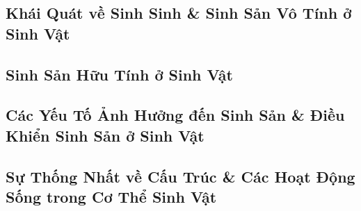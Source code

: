 \documentclass{article}
\numberwithin{equation}{section}
\begin{document}
\subsection{Khái Quát về Sinh Sinh \& Sinh Sản Vô Tính ở Sinh Vật}


\subsection{Sinh Sản Hữu Tính ở Sinh Vật}


\subsection{Các Yếu Tố Ảnh Hưởng đến Sinh Sản \& Điều Khiển Sinh Sản ở Sinh Vật}


\subsection{Sự Thống Nhất về Cấu Trúc \& Các Hoạt Động Sống trong Cơ Thể Sinh Vật}


\printbibliography[heading=bibintoc]
	
\end{document}
